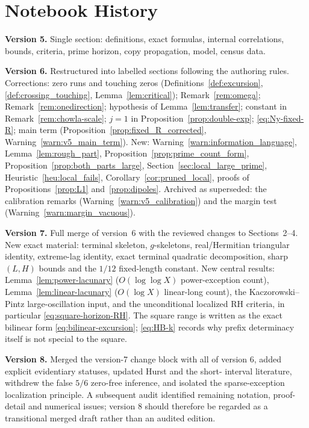 \documentclass[11pt]{amsart}
\numberwithin{equation}{section}
\theoremstyle{plain}
\theoremstyle{definition}
\theoremstyle{remark}
\begin{document}
\section*{Notebook History}
\label{sec:history}

\noindent\textbf{Version 5.} Single section: definitions, exact formulas,
internal correlations, bounds, criteria, prime horizon, copy propagation,
model, census data.

\medskip
\noindent\textbf{Version 6.} Restructured into labelled sections following
the authoring rules. Corrections: zero runs and touching zeros
(Definitions~\ref{def:excursion}, \ref{def:crossing_touching},
Lemma~\ref{lem:critical}); Remark~\ref{rem:omega};
Remark~\ref{rem:onedirection}; hypothesis of Lemma~\ref{lem:transfer};
constant in Remark~\ref{rem:chowla-scale}; $j=1$ in
Proposition~\ref{prop:double-exp}; \eqref{eq:Ny-fixed-R}; main term
(Proposition~\ref{prop:fixed_R_corrected}, Warning~\ref{warn:v5_main_term}).
New: Warning~\ref{warn:information_language}, Lemma~\ref{lem:rough_part},
Proposition~\ref{prop:prime_count_form},
Proposition~\ref{prop:both_parts_large},
Section~\ref{sec:local_large_prime}, Heuristic~\ref{heu:local_fails},
Corollary~\ref{cor:pruned_local}, proofs of
Propositions~\ref{prop:L1} and~\ref{prop:dipoles}. Archived as superseded:
the calibration remarks (Warning~\ref{warn:v5_calibration}) and the margin
test (Warning~\ref{warn:margin_vacuous}).

\medskip
\noindent\textbf{Version 7.} Full merge of version~6 with the reviewed
changes to Sections~2--4. New exact material: terminal skeleton,
$g$-skeletons, real/Hermitian triangular identity, extreme-lag identity,
exact terminal quadratic decomposition, sharp $(L,H)$ bounds and the $1/12$
fixed-length constant. New central results:
Lemma~\ref{lem:power-lacunary} ($O(\log\log X)$ power-exception count),
Lemma~\ref{lem:linear-lacunary} ($O(\log X)$ linear-long count), the Kaczorowski--Pintz large-oscillation input, and the unconditional localized
RH criteria, in particular \eqref{eq:square-horizon-RH}. The square range is
written as the exact bilinear form \eqref{eq:bilinear-excursion};
\eqref{eq:HB-k} records why prefix determinacy itself is not special to the
square.

\medskip
\noindent\textbf{Version 8.} Merged the version-7 change block with all of
version 6, added explicit evidentiary statuses, updated Hurst and the short-
interval literature, withdrew the false $5/6$ zero-free inference, and
isolated the sparse-exception localization principle.  A subsequent audit
identified remaining notation, proof-detail and numerical issues; version 8
should therefore be regarded as a transitional merged draft rather than an
audited edition.
\end{document}
